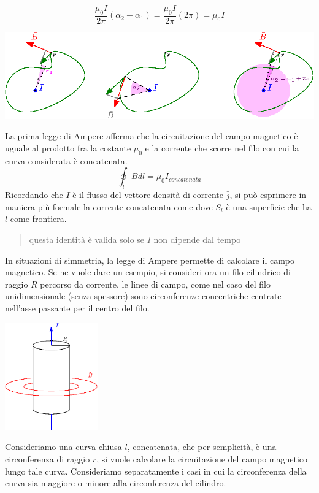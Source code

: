 \documentclass[10pt, letterpaper]{report}
\begin{document}
$$ \frac{\mu_0I}{2\pi}(\alpha_2-\alpha_1)= \frac{\mu_0I}{2\pi}(2\pi)=\mu_0I $$
\begin{center}
    \includegraphics[width=1\textwidth ]{images/CircuitazioneCampoMagnetico2.eps}
\end{center}
La prima legge di Ampere afferma che la circuitazione del campo magnetico è uguale al prodotto fra la costante $\mu_0$ e la corrente che scorre nel filo con cui la curva considerata è concatenata.
$$\oint_l \bar B d\bar l = \mu_0I_{concatenata} $$
Ricordando che $I$ è il flusso del vettore densità di corrente $\bar j$, si può esprimere in maniera più formale la corrente concatenata come 
dove $S_l$ è una superficie che ha 
$l$ come frontiera.\begin{quote}
    questa identità è valida solo se $I$ non dipende dal tempo
\end{quote}
In situazioni di simmetria, la legge di Ampere permette di calcolare il campo magnetico. Se ne vuole dare un esempio, si consideri ora un filo cilindrico di raggio $R$ percorso da corrente, le linee di campo, come nel caso del filo unidimensionale (senza spessore) sono circonferenze concentriche centrate nell'asse passante per il centro del filo.
\begin{center}
    \includegraphics[width=0.3\textwidth ]{images/cilindroElettrico.eps}
\end{center}
Consideriamo una curva chiusa $l$, concatenata, che per semplicità, è una circonferenza di raggio $r$, si vuole calcolare la circuitazione del campo magnetico lungo tale curva. Consideriamo separatamente i casi in cui la circonferenza della curva sia maggiore o minore alla circonferenza del cilindro.\acc 
\end{document}
